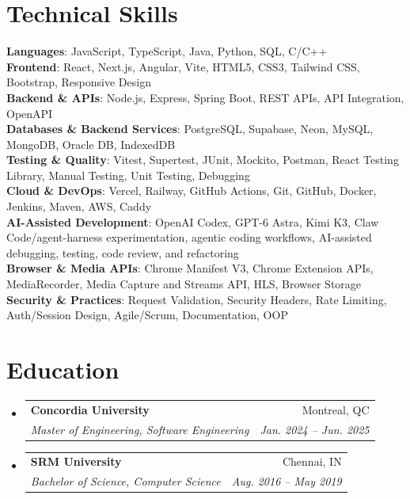 \documentclass[letterpaper,11pt]{article}
\makeatletter
\newcommand{\resumeSubheading}[4]{
  \vspace{-2pt}\item
    \begin{tabular*}{0.97\textwidth}[t]{l@{\extracolsep{\fill}}r}
      \textbf{#1} & #2 \\
      \textit{\small#3} & \textit{\small #4} \\
    \end{tabular*}\vspace{-4pt}
}
\newcommand{\resumeSubHeadingListStart}{\begin{itemize}[leftmargin=0.15in, label={}]}
\newcommand{\resumeSubHeadingListEnd}{\end{itemize}}
\makeatother
\begin{document}
\section{Technical Skills}
 \begin{itemize}[leftmargin=0.15in, label={}]
    \small{\item{
     \textbf{Languages}{: JavaScript, TypeScript, Java, Python, SQL, C/C++} \\
     \textbf{Frontend}{: React, Next.js, Angular, Vite, HTML5, CSS3, Tailwind CSS, Bootstrap, Responsive Design} \\
     \textbf{Backend \& APIs}{: Node.js, Express, Spring Boot, REST APIs, API Integration, OpenAPI} \\
     \textbf{Databases \& Backend Services}{: PostgreSQL, Supabase, Neon, MySQL, MongoDB, Oracle DB, IndexedDB} \\
     \textbf{Testing \& Quality}{: Vitest, Supertest, JUnit, Mockito, Postman, React Testing Library, Manual Testing, Unit Testing, Debugging} \\
     \textbf{Cloud \& DevOps}{: Vercel, Railway, GitHub Actions, Git, GitHub, Docker, Jenkins, Maven, AWS, Caddy} \\
     \textbf{AI-Assisted Development}{: OpenAI Codex, GPT-6 Astra, Kimi K3, Claw Code/agent-harness experimentation, agentic coding workflows, AI-assisted debugging, testing, code review, and refactoring} \\
     \textbf{Browser \& Media APIs}{: Chrome Manifest V3, Chrome Extension APIs, MediaRecorder, Media Capture and Streams API, HLS, Browser Storage} \\
     \textbf{Security \& Practices}{: Request Validation, Security Headers, Rate Limiting, Auth/Session Design, Agile/Scrum, Documentation, OOP}
    }}
 \end{itemize}
 \vspace{-15pt}

\section{Education}
  \resumeSubHeadingListStart
    \resumeSubheading
      {Concordia University}{Montreal, QC}
      {Master of Engineering, Software Engineering}{Jan. 2024 -- Jun. 2025}
    \resumeSubheading
      {SRM University}{Chennai, IN}
      {Bachelor of Science, Computer Science}{Aug. 2016 -- May 2019}
  \resumeSubHeadingListEnd
\end{document}

